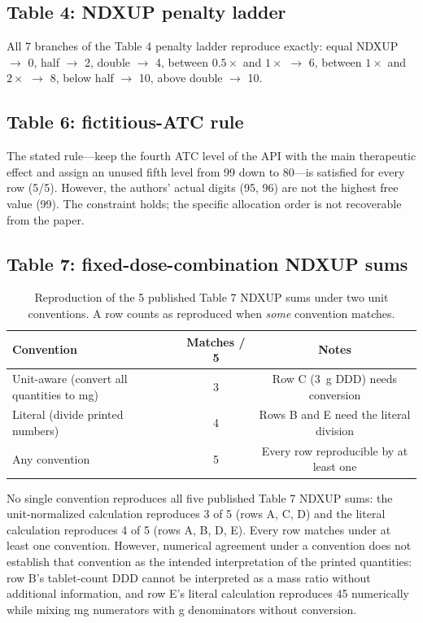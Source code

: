 \documentclass[12pt]{article}
\begin{document}
\subsection{Table 4: NDXUP penalty ladder}
\label{sec:results-table4}

All 7 branches of the Table 4 penalty ladder reproduce exactly: equal NDXUP $\to$ 0, half $\to$ 2, double $\to$ 4, between $0.5\times$ and $1\times$ $\to$ 6, between $1\times$ and $2\times$ $\to$ 8, below half $\to$ 10, above double $\to$ 10.

\subsection{Table 6: fictitious-ATC rule}
\label{sec:results-table6}

The stated rule---keep the fourth ATC level of the API with the main therapeutic effect and assign an unused fifth level from 99 down to 80---is satisfied for every row (5/5). However, the authors' actual digits (95, 96) are not the highest free value (99). The constraint holds; the specific allocation order is not recoverable from the paper.

\subsection{Table 7: fixed-dose-combination NDXUP sums}
\label{sec:results-table7}

\begin{table}[htbp]
\centering\small
\caption{Reproduction of the 5 published Table 7 NDXUP sums under two unit conventions. A row counts as reproduced when \emph{some} convention matches.}
\label{tab:table7}
\begin{tabular}{@{}p{4.2cm}cc@{}}
\toprule
Convention & Matches / 5 & Notes \\
\midrule
Unit-aware (convert all quantities to mg) & 3 & Row C (3~g DDD) needs conversion \\
Literal (divide printed numbers) & 4 & Rows B and E need the literal division \\
Any convention & 5 & Every row reproducible by at least one \\
\bottomrule
\end{tabular}
\end{table}

No single convention reproduces all five published Table 7 NDXUP sums: the unit-normalized calculation reproduces 3 of 5 (rows A, C, D) and the literal calculation reproduces 4 of 5 (rows A, B, D, E). Every row matches under at least one convention. However, numerical agreement under a convention does not establish that convention as the intended interpretation of the printed quantities: row B's tablet-count DDD cannot be interpreted as a mass ratio without additional information, and row E's literal calculation reproduces 45 numerically while mixing mg numerators with g denominators without conversion.
\end{document}
